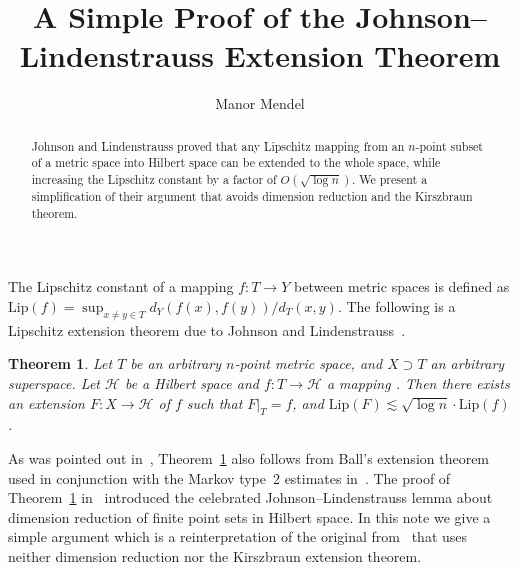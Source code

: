 \documentclass{amsart}
\newtheorem{theorem}{Theorem}
\newcommand{\Lip}{\mathrm{Lip}}
\begin{document}
   
    \title{A Simple Proof of the Johnson--Lindenstrauss Extension Theorem}  
 \author{Manor Mendel}
 \address{Mathematics \& Computer Science Department, The Open University of Israel}
\begin{abstract}
    Johnson and Lindenstrauss proved that any Lipschitz mapping from an $n$-point subset of a metric space into Hilbert space can be extended to the whole space, while increasing the Lipschitz constant by  a factor of $O(\sqrt{\log n})$. 
    We present a simplification of their argument that avoids dimension reduction and the Kirszbraun theorem.
\end{abstract} 

\maketitle



%
%
    
The Lipschitz constant of a mapping $f:T\to Y$ between metric spaces is defined as
$\Lip(f)=\sup_{x\ne y \in T} d_Y(f(x),f(y))/d_T(x,y)$.
The following is a Lipschitz extension theorem due to Johnson and Lindenstrauss~\cite{JL84}.

\begin{theorem} \label{thm:JL}
    Let $T$ be an arbitrary $n$-point metric space, and $X\supset T$ an arbitrary superspace. Let $\mathcal H$ be a Hilbert space and $f:T\to \mathcal H$ a   mapping . Then there exists an extension $F:X\to \mathcal H$ of $f$ such that $F|_T=f$, and $\Lip(F) \lesssim \sqrt{\log n} \cdot \Lip(f)$.
\end{theorem}

As was pointed out in~\cite{MN06-ball}, Theorem~\ref{thm:JL} also follows from Ball's 
extension theorem~\cite{Ball} used in conjunction with the Markov type~2 estimates in~\cite{NPSS06}.
The proof of Theorem~\ref{thm:JL} in~\cite{JL84} introduced the celebrated 
Johnson--Lindenstrauss lemma about dimension reduction of finite point sets in Hilbert space. 
In this note we give a simple argument which is a reinterpretation of the original  from~\cite{JL84}
that uses neither dimension reduction nor the Kirszbraun extension theorem.
\end{document}

